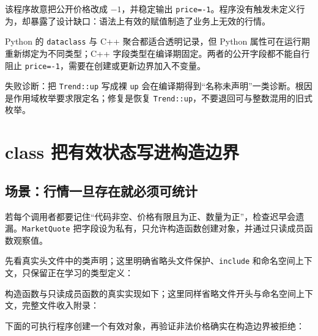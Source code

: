 该程序故意把公开价格改成 \(-1\)，并稳定输出 \texttt{price=-1}。程序没有触发未定义行为，却暴露了设计缺口：语法上有效的赋值制造了业务上无效的行情。

\begin{pythonbridge}
Python 的 \texttt{dataclass} 与 C++ 聚合都适合透明记录，但 Python 属性可在运行期重新绑定为不同类型；C++ 字段类型在编译期固定。两者的公开字段都不能自行阻止 \texttt{price=-1}，需要在创建或更新边界加入不变量。

\end{pythonbridge}

失败诊断：把 \texttt{Trend::up} 写成裸 \texttt{up} 会在编译期得到“名称未声明”一类诊断。根因是作用域枚举要求限定名；修复是恢复 \texttt{Trend::up}，不要退回可与整数混用的旧式枚举。

\section{class 把有效状态写进构造边界}

\subsection{场景：行情一旦存在就必须可统计}

若每个调用者都要记住“代码非空、价格有限且为正、数量为正”，检查迟早会遗漏。\texttt{MarketQuote} 把字段设为私有，只允许构造函数创建对象，并通过只读成员函数观察值。

先看真实头文件中的类声明；这里明确省略头文件保护、\texttt{include} 和命名空间上下文，只保留正在学习的类型定义：



构造函数与只读成员函数的真实实现如下；这里同样省略文件开头与命名空间上下文，完整文件收入附录：



下面的可执行程序创建一个有效对象，再验证非法价格确实在构造边界被拒绝：




